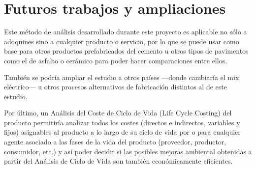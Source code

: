 \section{Futuros trabajos y ampliaciones}

Este método de análisis desarrollado durante este proyecto es aplicable no sólo a adoquines sino a cualquier producto o servicio, por lo que se puede usar como base para otros productos prefabricados del cemento u otros tipos de pavimentos como el de asfalto o cerámico para poder hacer comparaciones entre ellos.

También se podría ampliar el estudio a otros países —donde cambiaría el mix eléctrico— u otros procesos alternativos de fabricación distintos al de este estudio.

Por último, un Análisis del Coste de Ciclo de Vida (Life Cycle Costing) del producto permitiría analizar todos los costes (directos e indirectos, variables y fijos) asignables al producto a lo largo de su ciclo de vida por o para cualquier agente asociado a las fases de la vida del producto (proveedor, productor, consumidor, etc.) y así poder decidir si las posibles mejoras ambiental obtenidas a partir del Análisis de Ciclo de Vida son también económicamente eficientes.
